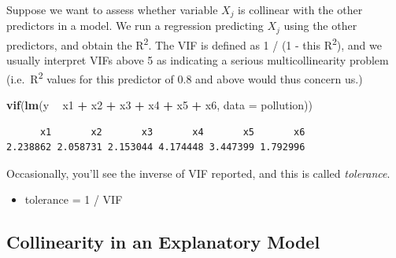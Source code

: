 \documentclass[]{book}
\newenvironment{Shaded}{\begin{snugshade}}{\end{snugshade}}
\newcommand{\KeywordTok}[1]{\textcolor[rgb]{0.13,0.29,0.53}{\textbf{#1}}}
\newcommand{\DataTypeTok}[1]{\textcolor[rgb]{0.13,0.29,0.53}{#1}}
\newcommand{\StringTok}[1]{\textcolor[rgb]{0.31,0.60,0.02}{#1}}
\newcommand{\OperatorTok}[1]{\textcolor[rgb]{0.81,0.36,0.00}{\textbf{#1}}}
\newcommand{\NormalTok}[1]{#1}
\providecommand{\tightlist}{%
  \setlength{\itemsep}{0pt}\setlength{\parskip}{0pt}}
\theoremstyle{definition}
\theoremstyle{definition}
\theoremstyle{definition}
\theoremstyle{remark}
\begin{document}
Suppose we want to assess whether variable \(X_j\) is collinear with the
other predictors in a model. We run a regression predicting \(X_j\)
using the other predictors, and obtain the R\textsuperscript{2}. The VIF
is defined as 1 / (1 - this R\textsuperscript{2}), and we usually
interpret VIFs above 5 as indicating a serious multicollinearity problem
(i.e.~R\textsuperscript{2} values for this predictor of 0.8 and above
would thus concern us.)

\begin{Shaded}
\begin{Highlighting}[]
\KeywordTok{vif}\NormalTok{(}\KeywordTok{lm}\NormalTok{(y }\OperatorTok{~}\StringTok{ }\NormalTok{x1 }\OperatorTok{+}\StringTok{ }\NormalTok{x2 }\OperatorTok{+}\StringTok{ }\NormalTok{x3 }\OperatorTok{+}\StringTok{ }\NormalTok{x4 }\OperatorTok{+}\StringTok{ }\NormalTok{x5 }\OperatorTok{+}\StringTok{ }\NormalTok{x6, }\DataTypeTok{data =}\NormalTok{ pollution))}
\end{Highlighting}
\end{Shaded}

\begin{verbatim}
      x1       x2       x3       x4       x5       x6 
2.238862 2.058731 2.153044 4.174448 3.447399 1.792996 
\end{verbatim}

Occasionally, you'll see the inverse of VIF reported, and this is called
\emph{tolerance}.

\begin{itemize}
\tightlist
\item
  tolerance = 1 / VIF
\end{itemize}

\subsection{Collinearity in an Explanatory
Model}\label{collinearity-in-an-explanatory-model}
\end{document}
